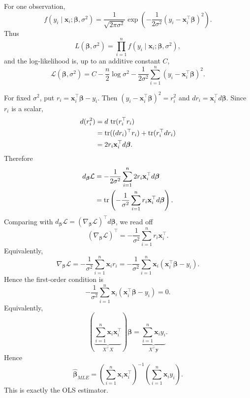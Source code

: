 \begin{pfbox}
For one observation,
\[
    f(y_i\mid\mathbf{x}_i;\boldsymbol{\beta},\sigma^2)
    =
    \frac{1}{\sqrt{2\pi\sigma^2}}
    \exp\left(
        -\frac{1}{2\sigma^2}
        (y_i-\mathbf{x}_i^{\top}\boldsymbol{\beta})^2
    \right).
\]
Thus
\[
    L(\boldsymbol{\beta},\sigma^2)
    =
    \prod_{i=1}^n f(y_i\mid\mathbf{x}_i;\boldsymbol{\beta},\sigma^2),
\]
and the log-likelihood is, up to an additive constant $C$,
\[
    \mathcal{L}(\boldsymbol{\beta},\sigma^2)
    =
    C
    -
    \frac{n}{2}\log\sigma^2
    -
    \frac{1}{2\sigma^2}
    \sum_{i=1}^n(y_i-\mathbf{x}_i^{\top}\boldsymbol{\beta})^2.
\]

For fixed $\sigma^2$, put $r_i=\mathbf{x}_i^{\top}\boldsymbol{\beta}-y_i$.
Then $(y_i-\mathbf{x}_i^{\top}\boldsymbol{\beta})^2=r_i^2$ and
$dr_i=\mathbf{x}_i^{\top}d\boldsymbol{\beta}$. Since $r_i$ is a scalar,
\[
\begin{aligned}
    d(r_i^2)
    &=
    d\,\operatorname{tr}(r_i^{\top}r_i)                                      \\
    &=
    \operatorname{tr}((dr_i)^{\top}r_i)+\operatorname{tr}(r_i^{\top}dr_i)                    \\
    &=
    2r_i\mathbf{x}_i^{\top}d\boldsymbol{\beta}.
\end{aligned}
\]
Therefore
\[
\begin{aligned}
    d_{\boldsymbol{\beta}}\mathcal{L}
    &=
    -\frac{1}{2\sigma^2}\sum_{i=1}^n
    2r_i\mathbf{x}_i^{\top}d\boldsymbol{\beta}                  \\
    &=
    \operatorname{tr}\left(
        -\frac{1}{\sigma^2}
        \sum_{i=1}^n r_i\mathbf{x}_i^{\top}
        d\boldsymbol{\beta}
    \right).
\end{aligned}
\]
Comparing with
$d_{\boldsymbol{\beta}}\mathcal{L}=(\nabla_{\boldsymbol{\beta}}\mathcal{L})^{\top}d\boldsymbol{\beta}$,
we read off
\[
    (\nabla_{\boldsymbol{\beta}}\mathcal{L})^{\top}
    =
    -\frac{1}{\sigma^2}
    \sum_{i=1}^n r_i\mathbf{x}_i^{\top}.
\]
Equivalently,
\[
    \nabla_{\boldsymbol{\beta}}\mathcal{L}
    =
    -\frac{1}{\sigma^2}
    \sum_{i=1}^n \mathbf{x}_i r_i
    =
    -\frac{1}{\sigma^2}
    \sum_{i=1}^n \mathbf{x}_i
    (\mathbf{x}_i^{\top}\boldsymbol{\beta}-y_i).
\]
Hence the first-order condition is
\[
    -\frac{1}{\sigma^2}
    \sum_{i=1}^n\mathbf{x}_i(\mathbf{x}_i^{\top}\boldsymbol{\beta}-y_i)
    =
    0.
\]
Equivalently,
\[
    \left(
        \underbrace{
            \sum_{i=1}^n \mathbf{x}_i\mathbf{x}_i^{\top}
        }_{X^{\top}X}
    \right)\boldsymbol{\beta}
    =
    \underbrace{
        \sum_{i=1}^n \mathbf{x}_i y_i
    }_{X^{\top}\mathbf{y}}.
\]
Hence
\[
    \widehat{\boldsymbol{\beta}}_{MLE}
    =
    \left(\sum_{i=1}^n \mathbf{x}_i\mathbf{x}_i^{\top}\right)^{-1}
    \left(\sum_{i=1}^n \mathbf{x}_i y_i\right).
\]
This is exactly the OLS estimator.


\end{pfbox}
